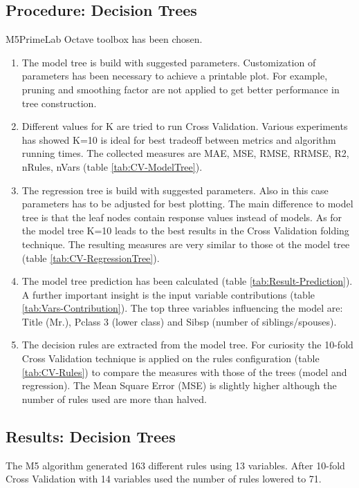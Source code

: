\documentclass{article}
\begin{document}
\subsection{Procedure: Decision Trees}
M5PrimeLab Octave toolbox has been chosen.
\begin{enumerate}  
	\item The model tree is build with suggested parameters. Customization of parameters has been necessary to achieve a printable plot. For example, pruning and smoothing factor are not applied to get better performance in tree construction.
	\item Different values for K are tried to run Cross Validation. Various experiments has showed K=10 is ideal for best tradeoff between metrics and algorithm running times. The collected measures are MAE, MSE, RMSE, RRMSE, R2, nRules, nVars (table \ref{tab:CV-ModelTree}).
	\item The regression tree is build with suggested parameters. Also in this case parameters has to be adjusted for best plotting. The main difference to model tree is that the leaf nodes contain response values instead of models. As for the model tree K=10 leads to the best results in the Cross Validation folding technique. The resulting measures are very similar to those ot the model tree (table \ref{tab:CV-RegressionTree}).
	\item The model tree prediction has been calculated (table \ref{tab:Result-Prediction}). A further important insight is the input variable contributions (table \ref{tab:Vars-Contribution}).  The top three variables influencing the model are: Title (Mr.), Pclass 3 (lower class) and Sibsp (number of siblings/spouses).
	\item The decision rules are extracted from the model tree. For curiosity the 10-fold Cross Validation technique is applied on the rules configuration (table \ref{tab:CV-Rules}) to compare the measures with those of the trees (model and regression). The Mean Square Error (MSE) is slightly higher although the number of rules used are more than halved.
\end{enumerate}

\subsection{Results: Decision Trees}
The M5 algorithm generated 163 different rules using 13 variables.
\break After 10-fold Cross Validation with 14 variables used the number of rules lowered to 71.
\end{document}

